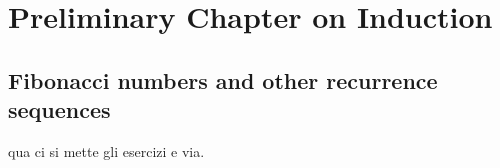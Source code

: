 
\chapter{Preliminary Chapter on Induction}
\label{chp:preliminary}

\section{Fibonacci numbers and other recurrence sequences}

qua ci si mette gli esercizi e via.
